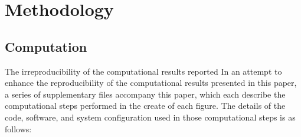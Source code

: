 \section{Methodology}\label{s:methodology}

\subsection{Computation}\label{s:computation}

The irreproducibility of the computational results reported 
In an attempt to enhance the reproducibility of the computational results presented in this paper, a series of supplementary files accompany this paper, which each describe the computational steps performed in the create of each figure. The details of the code, software, and system configuration used in those computational steps is as follows:   